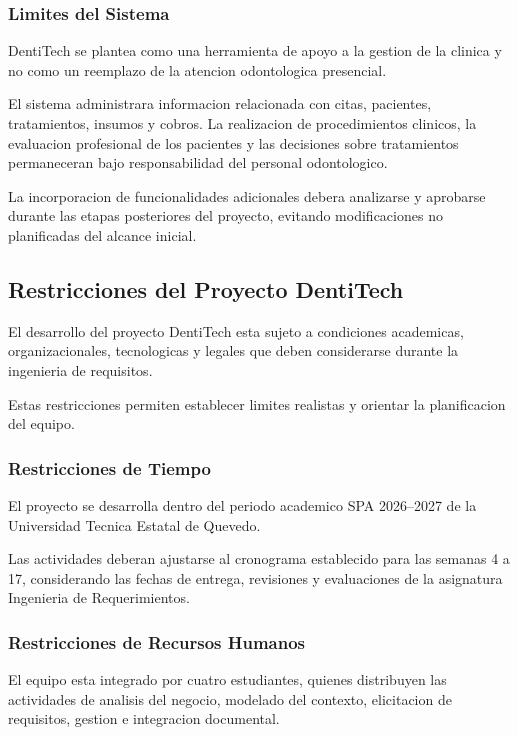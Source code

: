 \documentclass[12pt,a4paper]{article}
\begin{document}
\subsubsection{Limites del Sistema}

DentiTech se plantea como una herramienta de apoyo
a la gestion de la clinica y no como un reemplazo
de la atencion odontologica presencial.

El sistema administrara informacion relacionada
con citas, pacientes, tratamientos, insumos y
cobros. La realizacion de procedimientos clinicos,
la evaluacion profesional de los pacientes y las
decisiones sobre tratamientos permaneceran bajo
responsabilidad del personal odontologico.

La incorporacion de funcionalidades adicionales
debera analizarse y aprobarse durante las etapas
posteriores del proyecto, evitando modificaciones
no planificadas del alcance inicial.


\subsection{Restricciones del Proyecto DentiTech}

El desarrollo del proyecto DentiTech esta sujeto
a condiciones academicas, organizacionales,
tecnologicas y legales que deben considerarse
durante la ingenieria de requisitos.

Estas restricciones permiten establecer limites
realistas y orientar la planificacion del equipo.

\subsubsection{Restricciones de Tiempo}

El proyecto se desarrolla dentro del periodo
academico SPA 2026--2027 de la Universidad
Tecnica Estatal de Quevedo.

Las actividades deberan ajustarse al cronograma
establecido para las semanas 4 a 17, considerando
las fechas de entrega, revisiones y evaluaciones
de la asignatura Ingenieria de Requerimientos.

\subsubsection{Restricciones de Recursos Humanos}

El equipo esta integrado por cuatro estudiantes,
quienes distribuyen las actividades de analisis
del negocio, modelado del contexto, elicitacion
de requisitos, gestion e integracion documental.
\end{document}
